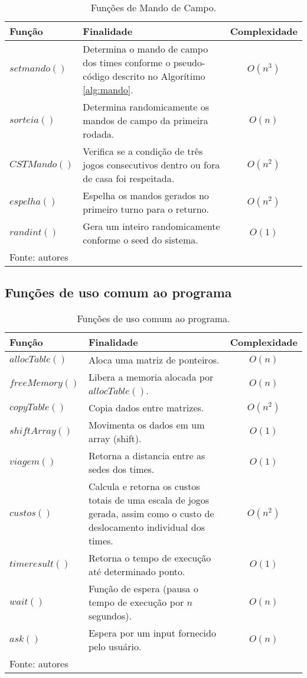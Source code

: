 \documentclass[12pt,a4paper]{article}
\begin{document}
\begin{table}[H]
	\renewcommand{\arraystretch}{1}
	\centering
	\caption{Funções de Mando de Campo.}
	\label{tab:mando}
	\begin{tabular}{p{2.7cm} p{9.5cm} c}
		\toprule 
		Função & Finalidade & Complexidade \\ 
		\midrule
		$setmando()$ & Determina o mando de campo dos times conforme o pseudo-código descrito no Algorítimo \ref{alg:mando}. & $O(n^3)$ \\
		$sorteia()$ & Determina randomicamente os mandos de campo da primeira rodada. & $O(n)$ \\
		$CSTMando()$ & Verifica se a condição de três jogos consecutivos dentro ou fora de casa foi respeitada. & $O(n^2)$ \\
		$espelha()$ & Espelha os mandos gerados no primeiro turno para o returno. & $O(n^2)$ \\
		$randint()$ & Gera um inteiro randomicamente conforme o seed do sistema. & $O(1)$ \\
		\bottomrule
		\footnotesize Fonte: autores
	\end{tabular}
\end{table}

\subsection{Funções de uso comum ao programa}

\begin{table}[H]
	\renewcommand{\arraystretch}{1}
	\centering
	\caption{Funções de uso comum ao programa.}
	\label{tab:comum}
	\begin{tabular}{p{2.7cm} p{9.5cm} c}
		\toprule 
		Função & Finalidade & Complexidade \\ 
		\midrule
		$allocTable()$ & Aloca uma matriz de ponteiros. & $O(n)$ \\
		$freeMemory()$ & Libera a memoria alocada por $allocTable()$. & $O(n)$ \\
		$copyTable()$ & Copia dados entre matrizes. & $O(n^2)$ \\
		$shiftArray()$ & Movimenta os dados em um array (shift). & $O(1)$ \\
		$viagem()$ & Retorna a distancia entre as sedes dos times. & $O(1)$ \\
		$custos()$ & Calcula e retorna os custos totais de uma escala de jogos gerada, assim como o custo de deslocamento individual dos times. & $O(n^2)$ \\
		$timeresult()$ & Retorna o tempo de execução até determinado ponto. & $O(1)$ \\
		$wait()$ & Função de espera (pausa o tempo de execução por $n$ segundos). & $O(n)$ \\
		$ask()$ & Espera por um input fornecido pelo usuário. & $O(n)$ \\
		\bottomrule
		\footnotesize Fonte: autores
	\end{tabular}
\end{table}
\end{document}
